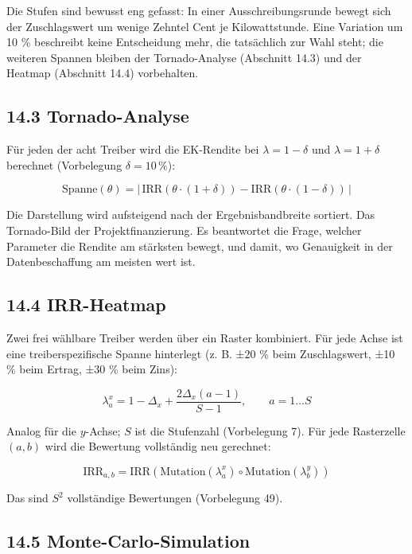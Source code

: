 \documentclass[
  a4paper,
  10pt]{article}
\begin{document}
Die Stufen sind bewusst eng gefasst: In einer Ausschreibungsrunde bewegt
sich der Zuschlagswert um wenige Zehntel Cent je Kilowattstunde. Eine
Variation um 10 \% beschreibt keine Entscheidung mehr, die tatsächlich
zur Wahl steht; die weiteren Spannen bleiben der Tornado-Analyse
(Abschnitt 14.3) und der Heatmap (Abschnitt 14.4) vorbehalten.

\hypertarget{tornado-analyse}{%
\subsection{14.3 Tornado-Analyse}\label{tornado-analyse}}

Für jeden der acht Treiber wird die EK-Rendite bei
\(\lambda = 1 - \delta\) und \(\lambda = 1 + \delta\) berechnet
(Vorbelegung \(\delta = 10\,\%\)):

\[ \mathrm{Spanne}(\theta) = \left|\,\mathrm{IRR}(\theta \cdot (1+\delta)) - \mathrm{IRR}(\theta \cdot (1-\delta))\,\right| \]

Die Darstellung wird aufsteigend nach der Ergebnisbandbreite sortiert.
Das Tornado-Bild der Projektfinanzierung. Es beantwortet die Frage,
welcher Parameter die Rendite am stärksten bewegt, und damit, wo
Genauigkeit in der Datenbeschaffung am meisten wert ist.

\hypertarget{irr-heatmap}{%
\subsection{14.4 IRR-Heatmap}\label{irr-heatmap}}

Zwei frei wählbare Treiber werden über ein Raster kombiniert. Für jede
Achse ist eine treiberspezifische Spanne hinterlegt (z. B. ±20 \% beim
Zuschlagswert, ±10 \% beim Ertrag, ±30 \% beim Zins):

\[ \lambda^{x}_a = 1 - \Delta_x + \frac{2\Delta_x (a-1)}{S-1}, \qquad a = 1 \dots S \]

Analog für die \(y\)-Achse; \(S\) ist die Stufenzahl (Vorbelegung 7).
Für jede Rasterzelle \((a,b)\) wird die Bewertung vollständig neu
gerechnet:

\[ \mathrm{IRR}_{a,b} = \mathrm{IRR}\left(\text{Mutation}(\lambda^{x}_a) \circ \text{Mutation}(\lambda^{y}_b)\right) \]

Das sind \(S^2\) vollständige Bewertungen (Vorbelegung 49).

\hypertarget{monte-carlo-simulation}{%
\subsection{14.5 Monte-Carlo-Simulation}\label{monte-carlo-simulation}}
\end{document}
